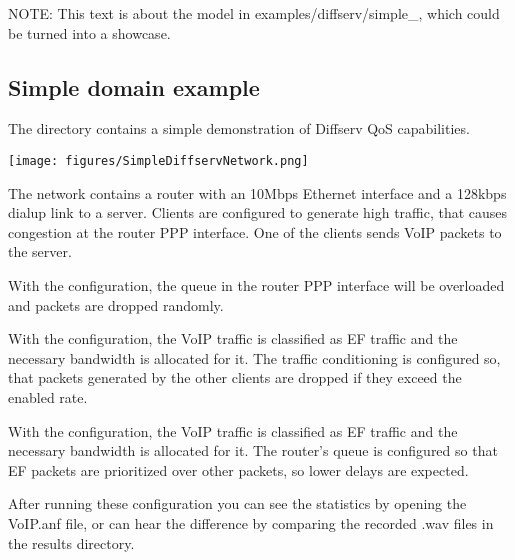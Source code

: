 

NOTE: This text is about the model in examples/diffserv/simple_, which could be turned into a showcase.

\subsection{Simple domain example}


The  directory contains a
simple demonstration of Diffserv QoS capabilities.

\begin{center}
\texttt{[image: figures/SimpleDiffservNetwork.png]}
\end{center}

The network contains a router with an 10Mbps Ethernet interface and a
128kbps dialup link to a server. Clients are configured to generate
high traffic, that causes congestion at the router PPP interface.
One of the clients sends VoIP packets to the server.

With the  configuration, the queue in the router PPP interface
will be overloaded and packets are dropped randomly.

With the  configuration, the VoIP traffic is classified as EF
traffic and the necessary bandwidth is allocated for it. The traffic conditioning
is configured so, that packets generated by the other clients are dropped if they
exceed the enabled rate.

With the  configuration, the VoIP traffic is classified as EF
traffic and the necessary bandwidth is allocated for it. The router's queue is configured
so that EF packets are prioritized over other packets, so lower delays are expected.

After running these configuration you can see the statistics by opening the
VoIP.anf file, or can hear the difference by comparing the recorded .wav files
in the results directory.


